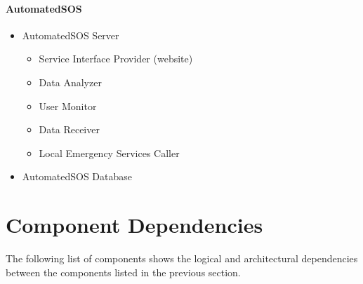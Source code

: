 \documentclass[../DD.tex]{subfiles}
\begin{document}
\paragraph{AutomatedSOS}
\begin{itemize}
	\item{AutomatedSOS Server}
	\begin{itemize}
		\item{Service Interface Provider (website)}
		\item{Data Analyzer}
		\item{User Monitor}
		\item{Data Receiver}
		\item{Local Emergency Services Caller}
	\end{itemize}
	\item{AutomatedSOS Database}
\end{itemize}

\section{Component Dependencies}
The following list of components shows the logical and architectural dependencies between the components listed in the previous section.
\end{document}

